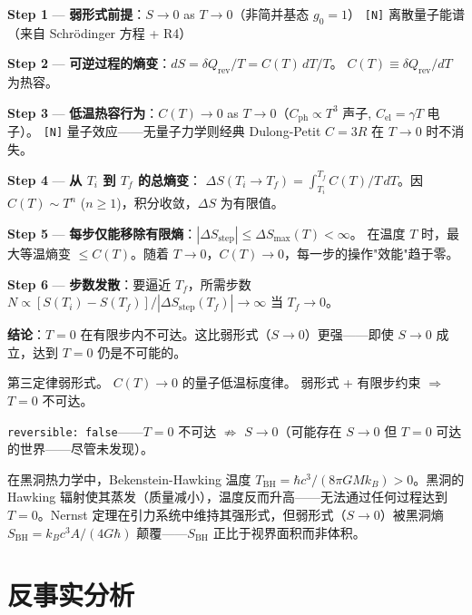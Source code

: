 \begin{derivationbox}[推导]

\noindent\textbf{Step 1} — \textbf{弱形式前提}：$S \to 0$ as $T \to 0$（非简并基态 $g_0=1$）
\hfill\texttt{[N]} 离散量子能谱（来自 Schr\"odinger 方程 + R4）

\noindent\textbf{Step 2} — \textbf{可逆过程的熵变}：$dS = \delta Q_{\text{rev}}/T = C(T)\,dT/T$。
$C(T) \equiv \delta Q_{\text{rev}}/dT$ 为热容。

\noindent\textbf{Step 3} — \textbf{低温热容行为}：$C(T) \to 0$ as $T \to 0$（$C_{\text{ph}} \propto T^3$ 声子, $C_{\text{el}} = \gamma T$ 电子）。
\hfill\texttt{[N]} 量子效应——无量子力学则经典 Dulong-Petit $C=3R$ 在 $T\to0$ 时不消失。

\noindent\textbf{Step 4} — \textbf{从 $T_i$ 到 $T_f$ 的总熵变}：
$\Delta S(T_i \to T_f) = \int_{T_i}^{T_f} C(T)/T\,dT$。因 $C(T) \sim T^n$ ($n\geq1$)，积分收敛，$\Delta S$ 为有限值。

\noindent\textbf{Step 5} — \textbf{每步仅能移除有限熵}：$|\Delta S_{\text{step}}| \leq \Delta S_{\text{max}}(T) < \infty$。
在温度 $T$ 时，最大等温熵变 $\leq C(T)$。随着 $T\to0$，$C(T)\to0$，每一步的操作"效能"趋于零。

\noindent\textbf{Step 6} — \textbf{步数发散}：要逼近 $T_f$，所需步数 $N \propto [S(T_i)-S(T_f)]/|\Delta S_{\text{step}}(T_f)| \to \infty$ 当 $T_f \to 0$。

\textbf{结论}：$T=0$ 在有限步内不可达。这比弱形式（$S\to0$）更强——即使 $S\to0$ 成立，达到 $T=0$ 仍是不可能的。

\end{derivationbox}

\fbox{[N]} 第三定律弱形式。\fbox{[N]} $C(T)\to0$ 的量子低温标度律。\fbox{[S]} 弱形式 + 有限步约束 $\Rightarrow$ $T=0$ 不可达。

\texttt{reversible: false}——$T=0$ 不可达 $\not\Rightarrow$ $S\to0$（可能存在 $S\to0$ 但 $T=0$ 可达的世界——尽管未发现）。

\begin{limitbox}
  在黑洞热力学中，Bekenstein-Hawking 温度 $T_{\text{BH}} = \hbar c^3/(8\pi G M k_B) > 0$。黑洞的 Hawking 辐射使其蒸发（质量减小），温度反而升高——无法通过任何过程达到 $T=0$。Nernst 定理在引力系统中维持其强形式，但弱形式（$S\to0$）被黑洞熵 $S_{\text{BH}} = k_B c^3 A/(4G\hbar)$ 颠覆——$S_{\text{BH}}$ 正比于视界面积而非体积。
\end{limitbox}

\section*{反事实分析}

